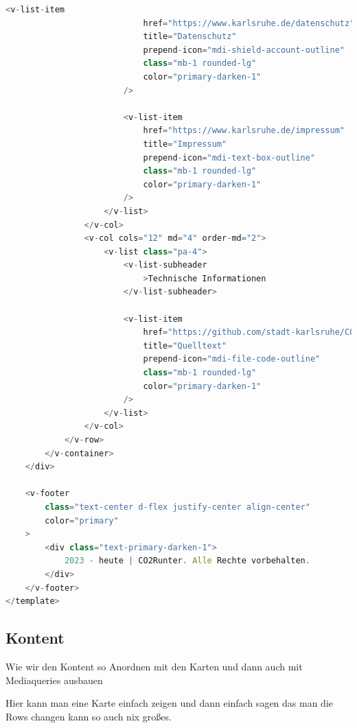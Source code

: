 \begin{lstlisting}[language={JavaScript}, caption={Footer Definition}]
                        <v-list-item
                            href="https://www.karlsruhe.de/datenschutz"
                            title="Datenschutz"
                            prepend-icon="mdi-shield-account-outline"
                            class="mb-1 rounded-lg"
                            color="primary-darken-1"
                        />

                        <v-list-item
                            href="https://www.karlsruhe.de/impressum"
                            title="Impressum"
                            prepend-icon="mdi-text-box-outline"
                            class="mb-1 rounded-lg"
                            color="primary-darken-1"
                        />
                    </v-list>
                </v-col>
                <v-col cols="12" md="4" order-md="2">
                    <v-list class="pa-4">
                        <v-list-subheader
                            >Technische Informationen
                        </v-list-subheader>

                        <v-list-item
                            href="https://github.com/stadt-karlsruhe/CO2-Runter"
                            title="Quelltext"
                            prepend-icon="mdi-file-code-outline"
                            class="mb-1 rounded-lg"
                            color="primary-darken-1"
                        />
                    </v-list>
                </v-col>
            </v-row>
        </v-container>
    </div>

    <v-footer
        class="text-center d-flex justify-center align-center"
        color="primary"
    >
        <div class="text-primary-darken-1">
            2023 - heute | CO2Runter. Alle Rechte vorbehalten.
        </div>
    </v-footer>
</template>
\end{lstlisting}

\subsection{Kontent}

Wie wir den Kontent so Anordnen mit den Karten und dann auch mit Mediaqueries ausbauen

Hier kann man eine Karte einfach zeigen und dann einfach sagen das man die Rows changen kann so auch nix großes.

